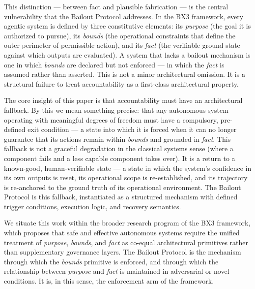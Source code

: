 This distinction — between fact and plausible fabrication — is the central vulnerability that the Bailout Protocol addresses. In the BX3 framework, every agentic system is defined by three constitutive elements: its \textit{purpose} (the goal it is authorized to pursue), its \textit{bounds} (the operational constraints that define the outer perimeter of permissible action), and its \textit{fact} (the verifiable ground state against which outputs are evaluated). A system that lacks a bailout mechanism is one in which \textit{bounds} are declared but not enforced — in which the \textit{fact} is assumed rather than asserted. This is not a minor architectural omission. It is a structural failure to treat accountability as a first-class architectural property.

The core insight of this paper is that accountability must have an architectural fallback. By this we mean something precise: that any autonomous system operating with meaningful degrees of freedom must have a compulsory, pre-defined exit condition — a state into which it is forced when it can no longer guarantee that its actions remain within \textit{bounds} and grounded in \textit{fact}. This fallback is not a graceful degradation in the classical systems sense (where a component fails and a less capable component takes over). It is a return to a known-good, human-verifiable state — a state in which the system's confidence in its own outputs is reset, its operational scope is re-established, and its trajectory is re-anchored to the ground truth of its operational environment. The Bailout Protocol is this fallback, instantiated as a structured mechanism with defined trigger conditions, execution logic, and recovery semantics.

We situate this work within the broader research program of the BX3 framework, which proposes that safe and effective autonomous systems require the unified treatment of \textit{purpose}, \textit{bounds}, and \textit{fact} as co-equal architectural primitives rather than supplementary governance layers. The Bailout Protocol is the mechanism through which the \textit{bounds} primitive is enforced, and through which the relationship between \textit{purpose} and \textit{fact} is maintained in adversarial or novel conditions. It is, in this sense, the enforcement arm of the framework.

